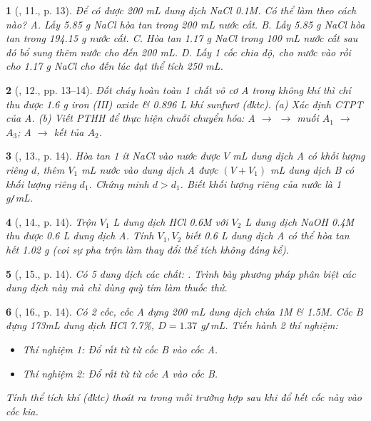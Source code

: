 \documentclass{article}
\newtheorem{baitoan}{}
\begin{document}
\begin{baitoan}[\cite{An_400_BT_Hoa_Hoc_9}, 11., p. 13]
	Để có được {\rm200 mL} dung dịch {\rm NaCl 0.1M}. Có thể làm theo cách nào? {\sf A.} Lấy {\rm5.85 g NaCl} hòa tan trong {\rm200 mL} nước cất. {\sf B.} Lấy {\rm5.85 g NaCl} hòa tan trong {\rm194.15 g} nước cất. {\sf C.} Hòa tan {\rm1.17 g NaCl} trong {\rm100 mL} nước cất sau đó bổ sung thêm nước cho đến {\rm200 mL}. {\sf D.} Lấy 1 cốc chia độ, cho nước vào rồi cho {\rm1.17 g NaCl} cho đến lúc đạt thể tích {\rm250 mL}.
\end{baitoan}

\begin{baitoan}[\cite{An_400_BT_Hoa_Hoc_9}, 12., pp. 13--14]
	Đốt cháy hoàn toàn 1 chất vô cơ A trong không khí thì chỉ thu được {\rm1.6 g} iron ({\rm III}) oxide \& {\rm0.896 L} khí sunfurơ (đktc). (a) Xác định {\rm CTPT} của A. (b) Viết {\rm PTHH} để thực hiện chuỗi chuyển hóa: A $\to$ {\rm {}} $\to$ muối $A_1$ $\to$ $A_3$; A $\to$ kết tủa $A_2$.
\end{baitoan}

\begin{baitoan}[\cite{An_400_BT_Hoa_Hoc_9}, 13., p. 14]
	Hòa tan 1 ít {\rm NaCl} vào nước được $V$ {\rm mL} dung dịch A có khối lượng riêng $d$, thêm $V_1$ {\rm mL} nước vào dung dịch A được $(V + V_1)$ mL dung dịch B có khối lượng riêng $d_1$. Chứng minh $d > d_1$. Biết khối lượng riêng của nước là {\rm1 g{\tt/}mL}.
\end{baitoan}

\begin{baitoan}[\cite{An_400_BT_Hoa_Hoc_9}, 14., p. 14]
	Trộn $V_1$ {\rm L} dung dịch {\rm HCl 0.6M} với $V_2$ {\rm L} dung dịch {\rm NaOH 0.4M} thu được {\rm0.6 L} dung dịch A. Tính $V_1,V_2$ biết {\rm0.6 L} dung dịch A có thể hòa tan hết {\rm1.02 g } (coi sự pha trộn làm thay đổi thể tích không đáng kể).
\end{baitoan}

\begin{baitoan}[\cite{An_400_BT_Hoa_Hoc_9}, 15., p. 14]
	Có 5 dung dịch các chất: {\rm{}}. Trình bày phương pháp phân biệt các dung dịch này mà chỉ dùng quỳ tím làm thuốc thử.
\end{baitoan}

\begin{baitoan}[\cite{An_400_BT_Hoa_Hoc_9}, 16., p. 14]
	Có 2 cốc, cốc A đựng {\rm200 mL} dung dịch chứa {\rm{} 1M} \& {\rm{} 1.5M}. Cốc B đựng {\rm173mL} dung dịch {\rm HCl 7.7\%}, $D = 1.37$ {\rm g{\tt/}mL}. Tiến hành 2 thí nghiệm:
	\begin{itemize}
		\item Thí nghiệm 1: Đổ rất từ từ cốc B vào cốc A.
		\item Thí nghiệm 2: Đổ rất từ từ cốc A vào cốc B.
	\end{itemize}
	Tính thể tích khí (đktc) thoát ra trong mỗi trường hợp sau khi đổ hết cốc này vào cốc kia.
\end{baitoan}
\end{document}
